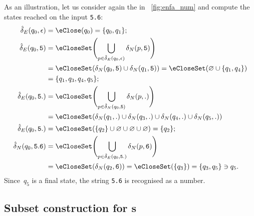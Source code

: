 As an illustration, let us consider again the \eNFA in
\fig~\vref{fig:enfa_num} and compute the states reached on the input
\verb+5.6+:
\begin{align*}
   \hat{\delta}_E (q_0, \epsilon)
&= \eClose (q_0) = \{q_0, q_1\};\\
   \hat{\delta}_E (q_0, \mathtt{5})
&= \eCloseSet \Biggl( \bigcup_{p \in \hat{\delta}_E (q_0,
   \epsilon)}{\delta_N (p, \mathtt{5})} \Biggr)\\
&= \eCloseSet (\delta_N (q_0, \mathtt{5}) \cup \delta_N (q_1,
   \mathtt{5})) = \eCloseSet (\varnothing \cup \{q_1, q_4\})\\
&= \{q_1, q_3, q_4, q_5\};\\
   \hat{\delta}_E (q_0, \mathtt{5.})
&= \eCloseSet \Biggl( \bigcup_{p \in \hat{\delta}_N (q_0,
   \mathtt{5})}{\delta_N (p, \mathtt{.})} \Biggr)\\
&= \eCloseSet (\delta_N (q_1, \mathtt{.}) \cup \delta_N (q_3,
   \mathtt{.}) \cup \delta_N (q_4, \mathtt{.}) \cup \delta_N (q_5,
   \mathtt{.}))\\
   \hat{\delta}_E (q_0, \mathtt{5.})
&= \eCloseSet (\{q_2\} \cup \varnothing \cup \varnothing \cup
   \varnothing)
 = \{q_2\};\\
   \hat{\delta}_N (q_0, \mathtt{5.6})
&= \eCloseSet \Biggl( \bigcup_{p \in \hat{\delta}_E (q_0,
     \mathtt{5.})}{\delta_N (p, \mathtt{6})} \Biggr)\\
&= \eCloseSet (\delta_N (q_2, \mathtt{6}))
= \eCloseSet (\{q_3\})
= \{q_3, q_5\} \ni q_5.
\end{align*}
Since~\(q_5\) is a final state, the string \verb+5.6+ is recognised as
a number.

\subsection*{Subset construction for \eNFA{}s}

